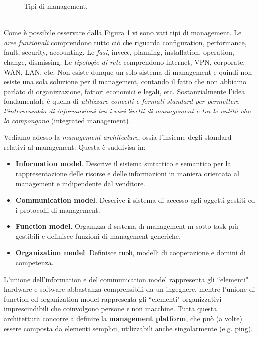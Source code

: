 \begin{figure}[htbp]
	\centering
	\caption{Tipi di management.}
	\label{img:management_types}
\end{figure}\\
Come è possibile osservare dalla Figura \ref{img:management_types} vi sono vari tipi di management. Le \textit{aree funzionali} comprendono tutto ciò che riguarda configuration, performance, fault, security, accounting. Le \textit{fasi}, invece, planning, installation, operation, change, dismissing. Le \textit{tipologie di rete} comprendono internet, VPN, corporate, WAN, LAN, etc. Non esiste dunque un solo sistema di management e quindi non esiste una sola soluzione per il management, contando il fatto che non abbiamo parlato di organizzazione, fattori economici e legali, etc. Sostanzialmente l'idea fondamentale è quella di \textit{utilizzare concetti e formati standard per permettere l'interscambio di informazioni tra i vari livelli di management e tra le entità che lo compongono} (integrated management).

\noindent Vediamo adesso la \textit{management architecture}, ossia l'insieme degli standard relativi al management. Questa è suddivisa in:
\begin{itemize}
	\item \textbf{Information model}. Descrive il sistema sintattico e semantico per la rappresentazione delle risorse e delle informazioni in maniera orientata al management e indipendente dal venditore.
	\item \textbf{Communication model}. Descrive il sistema di accesso agli oggetti gestiti ed i protocolli di management.
	\item \textbf{Function model}. Organizza il sistema di management in sotto-task più gestibili e definisce funzioni di management generiche.
	\item \textbf{Organization model}. Definisce ruoli, modelli di cooperazione e domini di competenza.
\end{itemize}
L'unione dell'information e del communication model rappresenta gli \textquotedblleft elementi" hardware e software abbastanza comprensibili da un ingegnere, mentre l'unione di function ed organization model rappresenta gli \textquotedblleft elementi" organizzativi imprescindibili che coinvolgono persone e non macchine. Tutta questa architettura concorre a definire la \textbf{management platform}, che può (a volte) essere composta da elementi semplici, utilizzabili anche singolarmente (e.g. ping).

